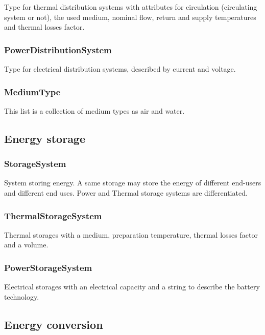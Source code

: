 \documentclass[a4paper,12pt]{article}
\begin{document}
Type for thermal distribution systems with attributes for circulation
(circulating system or not), the used medium, nominal flow, return and
supply temperatures and thermal losses factor.

\subsubsection{PowerDistributionSystem}\label{powerdistributionsystem}

Type for electrical distribution systems, described by current and
voltage.

\subsubsection{MediumType}\label{mediumtype}

This list is a collection of medium types as air and water.

\subsection{Energy storage}\label{energy-storage}

\subsubsection{StorageSystem}\label{storagesystem}

System storing energy. A same storage may store the energy of different
end-users and different end uses. Power and Thermal storage systems are
differentiated.

\subsubsection{ThermalStorageSystem}\label{thermalstoragesystem}

Thermal storages with a medium, preparation temperature, thermal losses
factor and a volume.

\subsubsection{PowerStorageSystem}\label{powerstoragesystem}

Electrical storages with an electrical capacity and a string to describe
the battery technology.

\subsection{Energy conversion}\label{energy-conversion}
\end{document}
